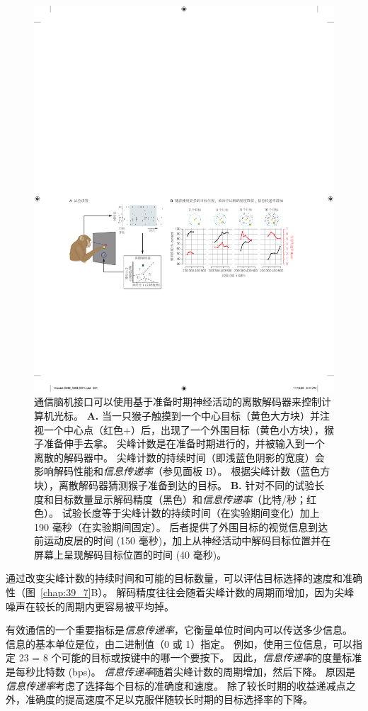\begin{figure}[htbp]
	\centering
	\includegraphics[width=0.75\linewidth]{chap39/fig_39_7}
	\caption{通信脑机接口可以使用基于准备时期神经活动的离散解码器来控制计算机光标。 
		\textbf{A.} 当一只猴子触摸到一个中心目标（黄色大方块）并注视一个中心点（红色+）后，出现了一个外围目标（黄色小方块），猴子准备伸手去拿。 
		尖峰计数是在准备时期进行的，并被输入到一个离散的解码器中。 
		尖峰计数的持续时间（即浅蓝色阴影的宽度）会影响解码性能和\textit{信息传递率}（参见面板 B）。 
		根据尖峰计数（蓝色方块），离散解码器猜测猴子准备到达的目标。 
		\textbf{B.} 针对不同的试验长度和目标数量显示解码精度（黑色）和\textit{信息传递率}（比特/秒；红色）。 
		试验长度等于尖峰计数的持续时间（在实验期间变化）加上 190 毫秒（在实验期间固定）。 
		后者提供了外围目标的视觉信息到达前运动皮层的时间 (150 毫秒)，加上从神经活动中解码目标位置并在屏幕上呈现解码目标位置的时间 (40 毫秒)\cite{santhanam2006high}。}
	\label{fig:39_7}
\end{figure}


通过改变尖峰计数的持续时间和可能的目标数量，可以评估目标选择的速度和准确性（图~\ref{chap:39_7}B）。
解码精度往往会随着尖峰计数的周期而增加，因为尖峰噪声在较长的周期内更容易被平均掉。


有效通信的一个重要指标是\textit{信息传递率}，它衡量单位时间内可以传送多少信息。
信息的基本单位是位，由二进制值（0 或 1）指定。
例如，使用三位信息，可以指定 23 = 8 个可能的目标或按键中的哪一个要按下。 
因此，\textit{信息传递率}的度量标准是每秒比特数 (bps)。
\textit{信息传递率}随着尖峰计数的周期增加，然后下降。
原因是\textit{信息传递率}考虑了选择每个目标的准确度和速度。
除了较长时期的收益递减点之外，准确度的提高速度不足以克服伴随较长时期的目标选择率的下降。


